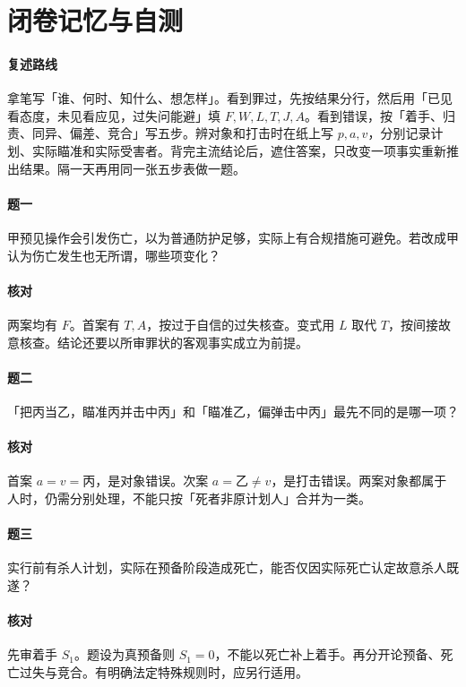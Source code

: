 \section*{闭卷记忆与自测}

\paragraph{复述路线}
拿笔写「谁、何时、知什么、想怎样」。看到罪过，先按结果分行，然后用「已见看态度，未见看应见，过失问能避」填 $F,W,L,T,J,A$。看到错误，按「着手、归责、同异、偏差、竞合」写五步。辨对象和打击时在纸上写 $p,a,v$，分别记录计划、实际瞄准和实际受害者。背完主流结论后，遮住答案，只改变一项事实重新推出结果。隔一天再用同一张五步表做一题。

\paragraph{题一}
甲预见操作会引发伤亡，以为普通防护足够，实际上有合规措施可避免。若改成甲认为伤亡发生也无所谓，哪些项变化？

\paragraph{核对}
两案均有 $F$。首案有 $T,A$，按过于自信的过失核查。变式用 $L$ 取代 $T$，按间接故意核查。结论还要以所审罪状的客观事实成立为前提。

\paragraph{题二}
「把丙当乙，瞄准丙并击中丙」和「瞄准乙，偏弹击中丙」最先不同的是哪一项？

\paragraph{核对}
首案 $a=v=\text{丙}$，是对象错误。次案 $a=\text{乙}\ne v$，是打击错误。两案对象都属于人时，仍需分别处理，不能只按「死者非原计划人」合并为一类。

\paragraph{题三}
实行前有杀人计划，实际在预备阶段造成死亡，能否仅因实际死亡认定故意杀人既遂？

\paragraph{核对}
先审着手 $S_1$。题设为真预备则 $S_1=0$，不能以死亡补上着手。再分开论预备、死亡过失与竞合。有明确法定特殊规则时，应另行适用。
